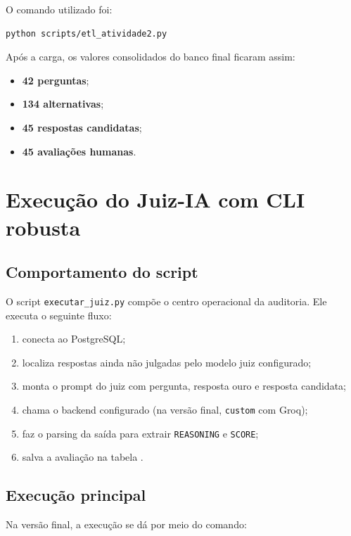 \documentclass[12pt,a4paper]{article}
\begin{document}
O comando utilizado foi:

\begin{lstlisting}[caption={Execucao do ETL}]
python scripts/etl_atividade2.py
\end{lstlisting}

Após a carga, os valores consolidados do banco final ficaram assim:

\begin{itemize}[leftmargin=1.2cm]
    \item \textbf{42 perguntas};
    \item \textbf{134 alternativas};
    \item \textbf{45 respostas candidatas};
    \item \textbf{45 avaliações humanas}. 
\end{itemize}

\section{Execução do Juiz-IA com CLI robusta}

\subsection{Comportamento do script}

O script \texttt{executar\_juiz.py} compõe o centro operacional da auditoria. Ele executa o seguinte fluxo:

\begin{enumerate}[leftmargin=1.2cm]
    \item conecta ao PostgreSQL;
    \item localiza respostas ainda não julgadas pelo modelo juiz configurado;
    \item monta o prompt do juiz com pergunta, resposta ouro e resposta candidata;
    \item chama o backend configurado (na versão final, \texttt{custom} com Groq);
    \item faz o parsing da saída para extrair \texttt{REASONING} e \texttt{SCORE};
    \item salva a avaliação na tabela . 
\end{enumerate}

\subsection{Execução principal}

Na versão final, a execução se dá por meio do comando:
\end{document}
